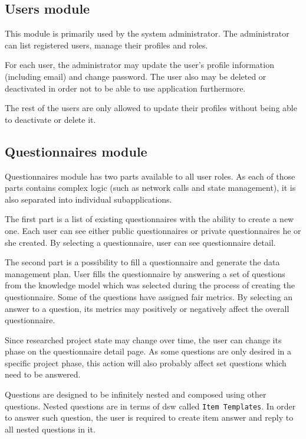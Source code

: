 \subsection{Users module}\label{sec:users-module}

This module is primarily used by the system administrator.
The administrator can list registered users, manage their profiles and roles.

For each user, the administrator may update the user's profile information (including email) and change password.
The user also may be deleted or deactivated in order not to be able to use application furthermore.

The rest of the users are only allowed to update their profiles without being able to deactivate or delete it.

\subsection{Questionnaires module}\label{sec:questionnaires-module}

Questionnaires module has two parts available to all user roles.
As each of those parts contains complex logic (such as network calls and state management), it is also separated into individual subapplications.

The first part is a list of existing questionnaires with the ability to create a new one.
Each user can see either public questionnaires or private questionnaires he or she created.
By selecting a questionnaire, user can see questionnaire detail.

The second part is a possibility to fill a questionnaire and generate the data management plan.
User fills the questionnaire by answering a set of questions from the knowledge model which was selected during the process of creating the questionnaire.
Some of the questions have assigned \gls{fair} metrics.
By selecting an answer to a question, its metrics may positively or negatively affect the overall questionnaire.

Since researched project state may change over time, the user can change its phase on the questionnaire detail page.
As some questions are only desired in a specific project phase, this action will also probably affect set questions which need to be answered.

Questions are designed to be infinitely nested and composed using other questions.
Nested questions are in terms of \gls{dsw} called \texttt{Item Templates}.
In order to answer such question, the user is required to create item answer and reply to all nested questions in it.

